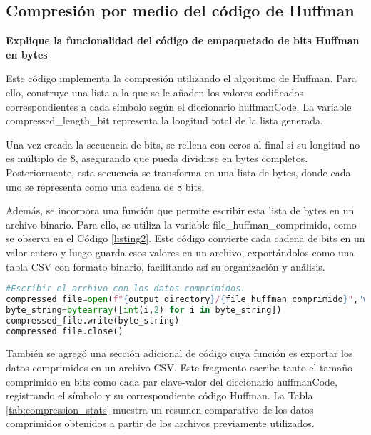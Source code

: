 \documentclass[conference,onecolumn,12pt]{IEEEtran}
\numberwithin{equation}{subsection}
\begin{document}
\subsection{Compresión por medio del código de Huffman}

\textbf{Explique la funcionalidad del código de empaquetado de bits Huffman en bytes}

Este código implementa la compresión utilizando el algoritmo de Huffman. Para ello, construye una lista a la que se le añaden los valores codificados correspondientes a cada símbolo según el diccionario huffmanCode. La variable compressed\_length\_bit representa la longitud total de la lista generada.

Una vez creada la secuencia de bits, se rellena con ceros al final si su longitud no es múltiplo de 8, asegurando que pueda dividirse en bytes completos. Posteriormente, esta secuencia se transforma en una lista de bytes, donde cada uno se representa como una cadena de 8 bits.

Además, se incorpora una función que permite escribir esta lista de bytes en un archivo binario. Para ello, se utiliza la variable file\_huffman\_comprimido, como se observa en el Código \ref{listing2}. Este código convierte cada cadena de bits en un valor entero y luego guarda esos valores en un archivo, exportándolos como una tabla CSV con formato binario, facilitando así su organización y análisis.



\begin{lstlisting}[language=Python, caption={Función de lista en archivo binario usando file\_huffman\_comprimido}, label={listing2}]
#Escribir el archivo con los datos comprimidos.
compressed_file=open(f"{output_directory}/{file_huffman_comprimido}","wb")
byte_string=bytearray([int(i,2) for i in byte_string])
compressed_file.write(byte_string)
compressed_file.close()
\end{lstlisting}

También se agregó una sección adicional de código cuya función es exportar los datos comprimidos en un archivo CSV. Este fragmento escribe tanto el tamaño comprimido en bits como cada par clave-valor del diccionario huffmanCode, registrando el símbolo y su correspondiente código Huffman. La Tabla \ref{tab:compression_stats}  muestra un resumen comparativo de los datos comprimidos obtenidos a partir de los archivos previamente utilizados.
\end{document}
